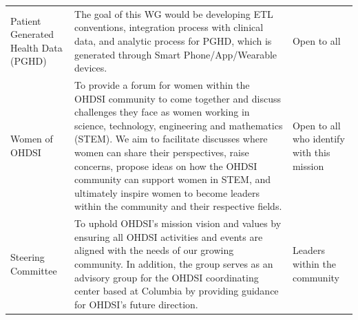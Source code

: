 \documentclass[11pt]{book}
\theoremstyle{definition}
\theoremstyle{definition}
\theoremstyle{definition}
\theoremstyle{remark}
\begin{document}
\begin{longtable}[]{@{}lll@{}}
\begin{minipage}[t]{0.08\columnwidth}\raggedright\strut
Patient Generated Health Data (PGHD)\strut
\end{minipage} & \begin{minipage}[t]{0.25\columnwidth}\raggedright\strut
The goal of this WG would be developing ETL conventions, integration
process with clinical data, and analytic process for PGHD, which is
generated through Smart Phone/App/Wearable devices.\strut
\end{minipage} & \begin{minipage}[t]{0.14\columnwidth}\raggedright\strut
Open to all\strut
\end{minipage}\tabularnewline
\begin{minipage}[t]{0.08\columnwidth}\raggedright\strut
Women of OHDSI\strut
\end{minipage} & \begin{minipage}[t]{0.25\columnwidth}\raggedright\strut
To provide a forum for women within the OHDSI community to come together
and discuss challenges they face as women working in science,
technology, engineering and mathematics (STEM). We aim to facilitate
discusses where women can share their perspectives, raise concerns,
propose ideas on how the OHDSI community can support women in STEM, and
ultimately inspire women to become leaders within the community and
their respective fields.\strut
\end{minipage} & \begin{minipage}[t]{0.14\columnwidth}\raggedright\strut
Open to all who identify with this mission\strut
\end{minipage}\tabularnewline
\begin{minipage}[t]{0.08\columnwidth}\raggedright\strut
Steering Committee\strut
\end{minipage} & \begin{minipage}[t]{0.25\columnwidth}\raggedright\strut
To uphold OHDSI's mission vision and values by ensuring all OHDSI
activities and events are aligned with the needs of our growing
community. In addition, the group serves as an advisory group for the
OHDSI coordinating center based at Columbia by providing guidance for
OHDSI's future direction.\strut
\end{minipage} & \begin{minipage}[t]{0.14\columnwidth}\raggedright\strut
Leaders within the community\strut
\end{minipage}\tabularnewline
\bottomrule
\end{longtable}
\end{document}
